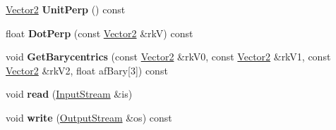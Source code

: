 \begin{DoxyCompactItemize}
\item 
\hyperlink{class_i_dream_sky_1_1_vector2}{Vector2} {\bfseries Unit\+Perp} () const \hypertarget{class_i_dream_sky_1_1_vector2_a970d909fef66de402a756e3b7295cf61}{}\label{class_i_dream_sky_1_1_vector2_a970d909fef66de402a756e3b7295cf61}

\item 
float {\bfseries Dot\+Perp} (const \hyperlink{class_i_dream_sky_1_1_vector2}{Vector2} \&rkV) const \hypertarget{class_i_dream_sky_1_1_vector2_ae1dc778b66b76c76b0960581388c374c}{}\label{class_i_dream_sky_1_1_vector2_ae1dc778b66b76c76b0960581388c374c}

\item 
void {\bfseries Get\+Barycentrics} (const \hyperlink{class_i_dream_sky_1_1_vector2}{Vector2} \&rk\+V0, const \hyperlink{class_i_dream_sky_1_1_vector2}{Vector2} \&rk\+V1, const \hyperlink{class_i_dream_sky_1_1_vector2}{Vector2} \&rk\+V2, float af\+Bary\mbox{[}3\mbox{]}) const \hypertarget{class_i_dream_sky_1_1_vector2_a403ee98493399cc3a634c71a0617625e}{}\label{class_i_dream_sky_1_1_vector2_a403ee98493399cc3a634c71a0617625e}

\item 
void {\bfseries read} (\hyperlink{class_i_dream_sky_1_1_input_stream}{Input\+Stream} \&is)\hypertarget{class_i_dream_sky_1_1_vector2_a466af4878ea452b46f4c3b2605be7e6d}{}\label{class_i_dream_sky_1_1_vector2_a466af4878ea452b46f4c3b2605be7e6d}

\item 
void {\bfseries write} (\hyperlink{class_i_dream_sky_1_1_output_stream}{Output\+Stream} \&os) const \hypertarget{class_i_dream_sky_1_1_vector2_a6473a1ff6ef471934663b314e2cc90a2}{}\label{class_i_dream_sky_1_1_vector2_a6473a1ff6ef471934663b314e2cc90a2}

\end{DoxyCompactItemize}
